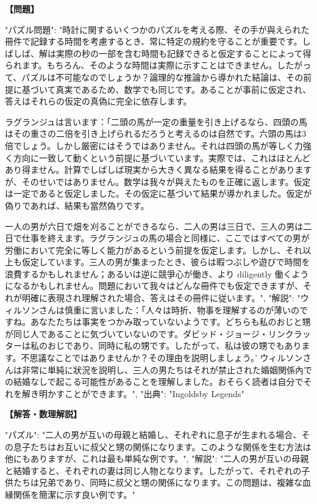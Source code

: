 \documentclass[10pt,a4paper,oneside,openany]{ltjsbook}
\begin{document}
\begin{tcolorbox}[colback=softblue,colframe=primaryblue,title=\textbf{第 56 問：WILSON'S POSER.},arc=2mm,boxrule=1pt,breakable]
\textbf{【問題】}\par\vspace{0.3em}
{
    "パズル問題": "時計に関するいくつかのパズルを考える際、その手が與えられた冊件で記録する時間を考慮するとき、常に特定の規約を守ることが重要です。しばしば、解は実際の秒の一部を含む時間も記録できると仮定することによって得られます。もちろん、そのような時間は実際に示すことはできません。したがって、パズルは不可能なのでしょうか？論理的な推論から導かれた結論は、その前提に基づいて真実であるため、数学でも同じです。あることが事前に仮定され、答えはそれらの仮定の真偽に完全に依存します。

ラグランジュは言います：「二頭の馬が一定の重量を引き上げるなら、四頭の馬はその重さの二倍を引き上げられるだろうと考えるのは自然です。六頭の馬は3倍でしょう。しかし厳密にはそうではありません。それは四頭の馬が等しく力強く方向に一致して動くという前提に基づいています。実際では、これはほとんどあり得ません。計算でしばしば現実から大きく異なる結果を得ることがありますが、そのせいではありません。数学は我々が與えたものを正確に返します。仮定は一定であると仮定しました。その仮定に基づいて結果が導かれました。仮定が偽りであれば、結果も當然偽りです。

一人の男が六日で畑を刈ることができるなら、二人の男は三日で、三人の男は二日で仕事を終えます。ラグランジュの馬の場合と同様に、ここではすべての男が労働において完全に等しく能力があるという前提を仮定します。しかし、それ以上も仮定しています。三人の男が集まったとき、彼らは暇つぶしや遊びで時間を浪費するかもしれません；あるいは逆に競爭心が働き、より diligently 働くようになるかもしれません。問題において我々はどんな冊件でも仮定できますが、それが明確に表現され理解された場合、答えはその冊件に従います。",
    "解説": "ウィルソンさんは慎重に言いました：「人々は時折、物事を理解するのが薄いのですね。あなたたちは事実をつかみ取っていないようです。どちらも私のおじと甥が同じ人であることに気づいていないのです。ダビッド・ジョージ・リンクラッターは私のおじであり、同時に私の甥です。したがって、私は彼の甥でもあります。不思議なことではありませんか？その理由を説明しましょう。'
ウィルソンさんは非常に単純に狀況を説明し、三人の男たちはそれが禁止された婚姻関係內での結婚なしで起こる可能性があることを理解しました。おそらく読者は自分でそれを解き明かすことができます。",
    "出典": "Ingoldsby Legends"
}
\tcblower
\textbf{【解答・数理解説】}\par\vspace{0.3em}
{
"パズル": "二人の男が互いの母親と結婚し、それぞれに息子が生まれる場合、その息子たちはお互いに叔父と甥の関係になります。このような関係を生む方法は他にもありますが、これは最も単純な例です。",
"解説": "二人の男が互いの母親と結婚すると、それぞれの妻は同じ人物となります。したがって、それぞれの子供たちは兄弟であり、同時に叔父と甥の関係になります。この問題は、複雑な血縁関係を簡潔に示す良い例です。"
}
\end{tcolorbox}
\end{document}
